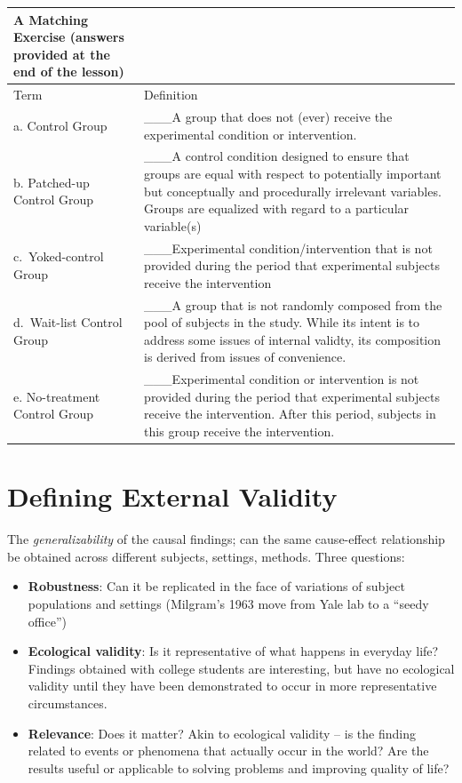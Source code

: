 \documentclass[
  english,
]{book}
\providecommand{\tightlist}{%
  \setlength{\itemsep}{0pt}\setlength{\parskip}{0pt}}
\begin{document}
\begin{longtable}[]{@{}
  >{\raggedright\arraybackslash}p{}
  >{\raggedright\arraybackslash}p{}@{}}
\toprule
A Matching Exercise (answers provided at the end of the lesson) & \\
\midrule
\endhead
Term & Definition \\
a. Control Group & \_\_\_A group that does not (ever) receive the experimental condition or intervention. \\
b. Patched-up Control Group & \_\_\_A control condition designed to ensure that groups are equal with respect to potentially important but conceptually and procedurally irrelevant variables. Groups are equalized with regard to a particular variable(s) \\
c.~Yoked-control Group & \_\_\_Experimental condition/intervention that is not provided during the period that experimental subjects receive the intervention \\
d.~Wait-list Control Group & \_\_\_A group that is not randomly composed from the pool of subjects in the study. While its intent is to address some issues of internal validty, its composition is derived from issues of convenience. \\
e. No-treatment Control Group & \_\_\_Experimental condition or intervention is not provided during the period that experimental subjects receive the intervention. After this period, subjects in this group receive the intervention. \\
\bottomrule
\end{longtable}

\hypertarget{defining-external-validity}{%
\section{Defining External Validity}\label{defining-external-validity}}

The \emph{generalizability} of the causal findings; can the same cause-effect relationship be obtained across different subjects, settings, methods. Three questions:

\begin{itemize}
\tightlist
\item
  \textbf{Robustness}: Can it be replicated in the face of variations of subject populations and settings (Milgram's 1963 move from Yale lab to a ``seedy office'')
\item
  \textbf{Ecological validity}: Is it representative of what happens in everyday life? Findings obtained with college students are interesting, but have no ecological validity until they have been demonstrated to occur in more representative circumstances.
\item
  \textbf{Relevance}: Does it matter? Akin to ecological validity -- is the finding related to events or phenomena that actually occur in the world? Are the results useful or applicable to solving problems and improving quality of life?
\end{itemize}
\end{document}
